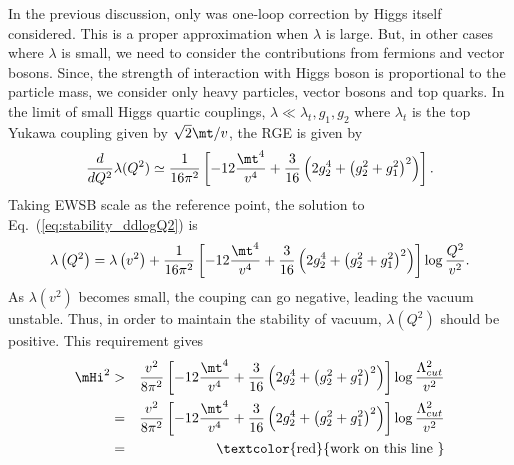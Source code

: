 In the previous discussion, only was one-loop correction by Higgs itself considered.
This is a proper approximation when $\lambda$ is large. But, in other cases
where $\lambda$ is small, we need to consider the contributions from fermions 
and vector bosons. Since, the strength of interaction with Higgs boson is proportional 
to the particle mass, we consider only heavy particles, vector bosons and top quarks.   
In the limit of small Higgs quartic couplings, $\lambda \ll \lambda_t, g_1, g_2$ 
where $\lambda_t$ is the top Yukawa coupling given by $\sqrt{2} \mt / v$, the RGE is 
given by \cite{Djouadi20081}
\begin{eqnarray}
\label{eq:stability_ddlogQ2}
\frac{d}{dQ^2} \lambda (Q^2)  
\simeq
\frac{1}{16\pi^2}  
\left[ -12 \frac{\mt^4}{v^4} + \frac{3}{16} \left(2g_2^4 + \left(g_2^2+g_1^2\right)^2 \right)   \right].
\end{eqnarray} 
Taking EWSB scale as the reference point, the solution to Eq.~(\ref{eq:stability_ddlogQ2}) is  
\begin{eqnarray} 
\lambda\left(Q^2\right) 
= 
\lambda\left(v^2\right)  
+ 
\frac{1}{16\pi^2}  \left[ -12 \frac{\mt^4}{v^4} 
                          + \frac{3}{16} \left(2g_2^4 + \left(g_2^2+g_1^2\right)^2 \right) \right]
                    \log \frac{Q^2}{v^2}.
\end{eqnarray} 
As $\lambda(v^2)$ becomes small, the couping can go negative, leading the vacuum unstable.   
Thus, in order to maintain the stability of vacuum, $\lambda\left(Q^2\right)$ should be 
positive. This requirement gives
\begin{eqnarray} 
\mHi^2 
&>&
\frac{v^2}{8\pi^2}  \left[ -12 \frac{\mt^4}{v^4} 
                          + \frac{3}{16} \left(2g_2^4 + \left(g_2^2+g_1^2\right)^2 \right) \right]
                    \log \frac{\Lambda_{cut}^2}{v^2} \\
&=&  
\frac{v^2}{8\pi^2}  \left[ -12 \frac{\mt^4}{v^4} 
                          + \frac{3}{16} \left(2g_2^4 + \left(g_2^2+g_1^2\right)^2 \right) \right]
                    \log \frac{\Lambda_{cut}^2}{v^2} \\
&=&  
\textrm{\textcolor{red}{work on this line }}
\end{eqnarray} 
%
